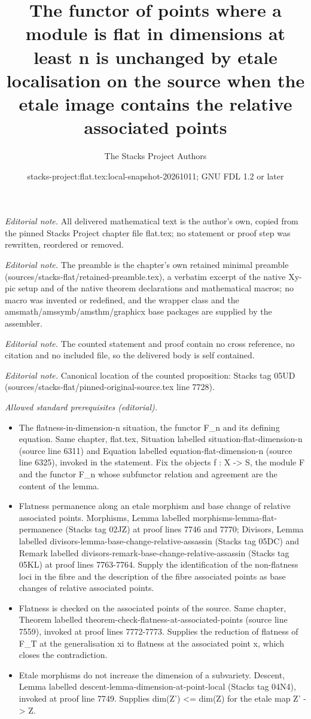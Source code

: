 \documentclass[10pt,a4paper]{amsart}
\title{The functor of points where a module is flat in dimensions at least n is unchanged by etale localisation on the source when the etale image contains the relative associated points}
\author{The Stacks Project Authors}
\date{stacks-project:flat.tex:local-snapshot-20261011; GNU FDL 1.2 or later}
\theoremstyle{plain}
\theoremstyle{definition}
\theoremstyle{remark}
\numberwithin{equation}{subsection}
\begin{document}
\maketitle
\noindent\textit{Editorial note.} All delivered mathematical text is the author's own, copied from the pinned Stacks Project chapter file flat.tex; no statement or proof step was rewritten, reordered or removed.\par\medskip
\noindent\textit{Editorial note.} The preamble is the chapter's own retained minimal preamble (sources/stacks-flat/retained-preamble.tex), a verbatim excerpt of the native Xy-pic setup and of the native theorem declarations and mathematical macros; no macro was invented or redefined, and the wrapper class and the amsmath/amssymb/amsthm/graphicx base packages are supplied by the assembler.\par\medskip
\noindent\textit{Editorial note.} The counted statement and proof contain no cross reference, no citation and no included file, so the delivered body is self contained.\par\medskip
\noindent\textit{Editorial note.} Canonical location of the counted proposition: Stacks tag 05UD (sources/stacks-flat/pinned-original-source.tex line 7728).\par\medskip
\noindent\textit{Allowed standard prerequisites (editorial).}\begin{itemize}
\item The flatness-in-dimension-n situation, the functor F\_n and its defining equation. Same chapter, flat.tex, Situation labelled situation-flat-dimension-n (source line 6311) and Equation labelled equation-flat-dimension-n (source line 6325), invoked in the statement. Fix the objects f : X -> S, the module F and the functor F\_n whose subfunctor relation and agreement are the content of the lemma.
\item Flatness permanence along an etale morphism and base change of relative associated points. Morphisms, Lemma labelled morphisms-lemma-flat-permanence (Stacks tag 02JZ) at proof lines 7746 and 7770; Divisors, Lemma labelled divisors-lemma-base-change-relative-assassin (Stacks tag 05DC) and Remark labelled divisors-remark-base-change-relative-assassin (Stacks tag 05KL) at proof lines 7763-7764. Supply the identification of the non-flatness loci in the fibre and the description of the fibre associated points as base changes of relative associated points.
\item Flatness is checked on the associated points of the source. Same chapter, Theorem labelled theorem-check-flatness-at-associated-points (source line 7559), invoked at proof lines 7772-7773. Supplies the reduction of flatness of F\_T at the generalisation xi to flatness at the associated point x, which closes the contradiction.
\item Etale morphisms do not increase the dimension of a subvariety. Descent, Lemma labelled descent-lemma-dimension-at-point-local (Stacks tag 04N4), invoked at proof line 7749. Supplies dim(Z') <= dim(Z) for the etale map Z' -> Z.
\end{itemize}\medskip
\end{document}
